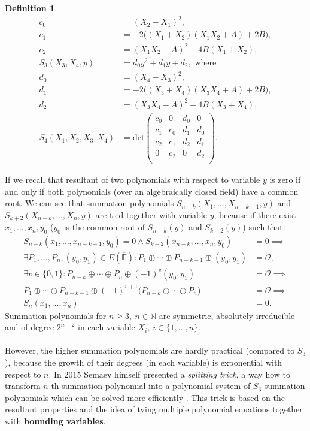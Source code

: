 \documentclass[thesis=M,english]{FITthesis}[2012/10/20]
\theoremstyle{remark}
\theoremstyle{definition}
\newtheorem{DF}{Definition}[section]
\begin{document}
\begin{DF}
\begin{align*}
c_0 &= (X_2-X_1)^2,\\ 
c_1 &= -2\bigg((X_1+X_2)(X_1X_2 + A) + 2B\bigg),\\
c_2 &=  (X_1X_2-A)^2 - 4B(X_1+X_2),  \\
S_3(X_3,X_4,y) &= d_0y^2 + d_1y + d_2, \text{ where } \\
d_0 &= (X_4-X_3)^2,\\ 
d_1 &= -2\bigg((X_3+X_4)(X_3X_4 + A) + 2B\bigg),\\
d_2 &=  (X_3X_4-A)^2 - 4B(X_3+X_4), \\
S_4(X_1,X_2,X_3,X_4) &= \text{det}
\begin{pmatrix}
c_0 & 0 & d_0 & 0 \\
c_1 & c_0  & d_1 & d_0  \\
c_2 & c_1 &  d_2 & d_1 \\
 0 & c_2 & 0 & d_2 \\
\end{pmatrix}.
\end{align*}
\end{DF}
\label{resExample}
\noindent If we recall that resultant of two polynomials with respect to variable $y$ is zero if and only if both polynomials (over an algebraically closed field) have a common root. We can see that summation polynomials $S_{n-k}(X_1,\ldots,X_{n-k-1},y)$ and $S_{k+2}(X_{n-k},\ldots,X_n,y)$ are tied together with variable $y$, because if there exist $x_1,\ldots, x_n, y_0$ ($y_0$ is the common root of $S_{n-k}(y)$ and $S_{k+2}(y)$) such that:
\begin{align*}
S_{n-k}(x_1,\ldots,x_{n-k-1}, y_0) = 0 \land S_{k+2}(x_{n-k},\ldots,x_{n}, y_0) &= 0 \implies\\ \exists P_1,\ldots,P_n, (y_0, y_1) \in E(\overline{\mathbb{F}}): P_1 \oplus \cdots \oplus P_{n-k-1} \oplus (y_0,y_1) &= \mathcal{O}, \\
\exists v \in \{0,1\}: P_{n-k} \oplus \cdots \oplus P_{n} \oplus (-1)^{v}(y_0,y_1) &= \mathcal{O} \implies \\P_1 \oplus \cdots \oplus P_{n-k-1} \oplus (-1)^{v+1}\bigg(P_{n-k} \oplus \cdots \oplus P_{n}\bigg) &= \mathcal{O} \implies \\
S_n(x_1,\ldots,x_n) &= 0.
\end{align*}
\noindent Summation polynomials for $n \geq 3,\ n \in \mathbb{N}$ are symmetric, absolutely irreducible and of degree $2^{n-2}$ in each variable $X_i,\ i \in \{1,\ldots,n\}$.\\ \\
However, the higher summation polynomials are hardly practical (compared to $S_3$), because the growth of their degrees (in each variable) is exponential with respect to $n$. In 2015 Semaev himself presented a \textit{splitting trick}, a way how to transform $n$-th summation polynomial into a polynomial system of $S_3$ summation polynomials which can be solved more efficiently \cite{semaev15}. This trick is based on the resultant properties and the idea of tying multiple polynomial equations together with \textbf{bounding variables}. 
\end{document}
